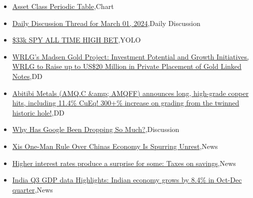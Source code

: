 \documentclass{article}%
\begin{document}
%
\begin{itemize}%
\item%
\href{https://reddit.com/r/wallstreetbets/comments/1b3rsot/asset\_class\_periodic\_table/}{Asset Class Periodic Table},Chart%
\item%
\href{https://reddit.com/r/wallstreetbets/comments/1b3rmfy/daily\_discussion\_thread\_for\_march\_01\_2024/}{Daily Discussion Thread for March 01, 2024},Daily Discussion%
\item%
\href{https://reddit.com/r/wallstreetbets/comments/1b3osv8/33k\_spy\_all\_time\_high\_bet/}{\$33k SPY ALL TIME HIGH BET},YOLO%
\item%
\href{https://reddit.com/r/Baystreetbets/comments/1b3es5k/wrlgs\_madsen\_gold\_project\_investment\_potential/}{WRLG's Madsen Gold Project: Investment Potential and Growth Initiatives, WRLG to Raise up to US\$20 Million in Private Placement of Gold Linked Notes},DD%
\item%
\href{https://reddit.com/r/Baystreetbets/comments/1b33tui/abitibi\_metals\_amqc\_amqff\_announces\_long/}{Abitibi Metals (AMQ.C \&amp; AMQFF) announces long, high-grade copper hits, including 11.4\% CuEq! 300+\% increase on grading from the twinned historic hole!},DD%
\item%
\href{https://reddit.com/r/StockMarket/comments/1b35gcg/why\_has\_google\_been\_dropping\_so\_much/}{Why Has Google Been Dropping So Much?},Discussion%
\item%
\href{https://reddit.com/r/Economics/comments/1b3nh6e/xis\_oneman\_rule\_over\_chinas\_economy\_is\_spurring/}{Xis One-Man Rule Over Chinas Economy Is Spurring Unrest},News%
\item%
\href{https://reddit.com/r/Economics/comments/1b3ekop/higher\_interest\_rates\_produce\_a\_surprise\_for\_some/}{Higher interest rates produce a surprise for some: Taxes on savings},News%
\item%
\href{https://reddit.com/r/Economics/comments/1b38bco/india\_q3\_gdp\_data\_highlights\_indian\_economy\_grows/}{India Q3 GDP data Highlights: Indian economy grows by 8.4\% in Oct-Dec quarter},News%
\end{itemize}%
\end{document}
